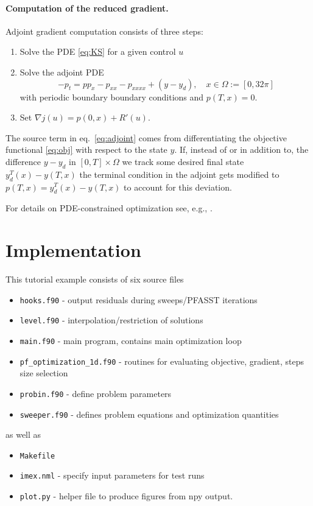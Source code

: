 \documentclass[a4paper]{article} %
\begin{document}
\paragraph{Computation of the reduced gradient.} Adjoint gradient computation consists of three steps:
\begin{enumerate}
	\item Solve the PDE \eqref{eq:KS} for a given control $u$
	\item Solve the adjoint PDE 
	\begin{equation}\label{eq:adjoint}
		-p_t = p p_x - p_{xx} - p_{xxxx} + (y-y_d), \quad x \in \Omega := [0,32\pi]
	\end{equation}
	with periodic boundary boundary conditions and $p(T,x) = 0$.
	\item Set $\nabla j(u) =  p(0,x) + R'(u)$. 
\end{enumerate}
The source term in eq.~\ref{eq:adjoint} comes from differentiating the objective functional \ref{eq:obj} with respect to the state $y$. If, instead of or in addition to, the difference $y-y_d$ in $[0,T] \times \Omega$ we track some desired final state $y_d^T(x)-y(T,x)$ the terminal condition in the adjoint gets modified to $p(T,x) =  y_d^T(x)-y(T,x)$ to account for this deviation.

For details on PDE-constrained optimization see, e.g., \cite{HinzeEtAl2009,Troeltzsch2010}.

\section{Implementation}


This tutorial example consists of six source files
\begin{itemize}
	\item \lstinline+hooks.f90+ - output residuals during sweeps/PFASST iterations
	\item \lstinline+level.f90+ - interpolation/restriction of solutions
	\item \lstinline+main.f90+ - main program, contains main optimization loop
	\item \lstinline+pf_optimization_1d.f90+ - routines for evaluating objective, gradient, steps size selection
	\item \lstinline+probin.f90+ - define problem parameters
	\item \lstinline+sweeper.f90+ - defines problem equations and optimization quantities
\end{itemize}
as well as
\begin{itemize}
	\item \lstinline+Makefile+
	\item \lstinline+imex.nml+ - specify input parameters for test runs
	\item \lstinline+plot.py+ - helper file to produce figures from npy output.
\end{itemize}
\end{document}

